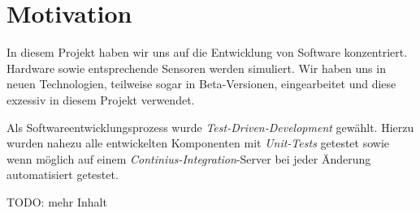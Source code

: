 \section{Motivation}

In diesem Projekt haben wir uns auf die Entwicklung von Software konzentriert.
	Hardware sowie entsprechende Sensoren werden simuliert. Wir haben uns in
	neuen Technologien, teilweise sogar in Beta-Versionen, eingearbeitet und 
	diese exzessiv in diesem Projekt verwendet.

Als Softwareentwicklungsprozess wurde \emph{Test-Driven-Development} gewählt.
	Hierzu wurden nahezu alle entwickelten Komponenten mit \emph{Unit-Tests}
	getestet sowie wenn möglich auf einem \emph{Continius-Integration}-Server
	bei jeder Änderung automatisiert getestet.
	
TODO: mehr Inhalt